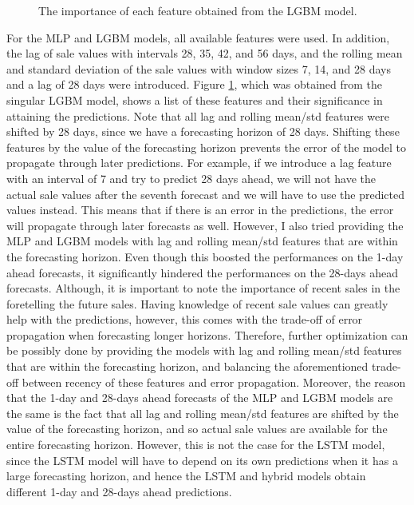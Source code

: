 \begin{figure}[b!]
    \centering
    \caption{The importance of each feature obtained from the LGBM model.}
    \label{fig:feat_imp}
\end{figure}
For the MLP and LGBM models, all available features were used. In addition, the lag of sale values with intervals 28, 35, 42, and 56 days, and the rolling mean and standard deviation of the sale values with window sizes 7, 14, and 28 days and a lag of 28 days were introduced.
Figure \ref{fig:feat_imp}, which was obtained from the singular LGBM model, shows a list of these features and their significance in attaining the predictions.
Note that all lag and rolling mean/std features were shifted by 28 days, since we have a forecasting horizon of 28 days.
Shifting these features by the value of the forecasting horizon prevents the error of the model to propagate through later predictions.
For example, if we introduce a lag feature with an interval of 7 and try to predict 28 days ahead, we will not have the actual sale values after the seventh forecast and we will have to use the predicted values instead. 
This means that if there is an error in the predictions, the error will propagate through later forecasts as well.
However, I also tried providing the MLP and LGBM models with lag and rolling mean/std features that are within the forecasting horizon. 
Even though this boosted the performances on the 1-day ahead forecasts, it significantly hindered the performances on the 28-days ahead forecasts.
Although, it is important to note the importance of recent sales in the foretelling the future sales. 
Having knowledge of recent sale values can greatly help with the predictions, however, this comes with the trade-off of error propagation when forecasting longer horizons.
Therefore, further optimization can be possibly done by providing the models with lag and rolling mean/std features that are within the forecasting horizon, and balancing the aforementioned trade-off between recency of these features and error propagation.
Moreover, the reason that the 1-day and 28-days ahead forecasts of the MLP and LGBM models are the same is the fact that all lag and rolling mean/std features are shifted by the value of the forecasting horizon, and so actual sale values are available for the entire forecasting horizon.
However, this is not the case for the LSTM model, since the LSTM model will have to depend on its own predictions when it has a large forecasting horizon, and hence the LSTM and hybrid models obtain different 1-day and 28-days ahead predictions.